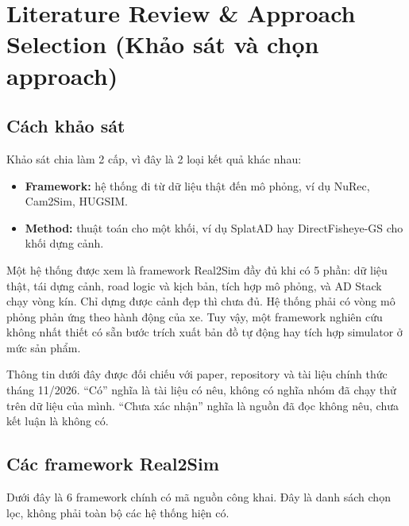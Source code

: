 \chapter{Literature Review \& Approach Selection (Khảo sát và chọn approach)}

\section{Cách khảo sát}

Khảo sát chia làm 2 cấp, vì đây là 2 loại kết quả khác nhau:
\begin{itemize}
  \item \textbf{Framework:} hệ thống đi từ dữ liệu thật đến mô phỏng, ví dụ NuRec, Cam2Sim, HUGSIM.
  \item \textbf{Method:} thuật toán cho một khối, ví dụ SplatAD hay DirectFisheye-GS cho khối dựng cảnh.
\end{itemize}

Một hệ thống được xem là framework Real2Sim đầy đủ khi có 5 phần: dữ liệu thật, tái dựng cảnh, road logic và kịch bản, tích hợp mô phỏng, và AD Stack chạy vòng kín.
Chỉ dựng được cảnh đẹp thì chưa đủ. Hệ thống phải có vòng mô phỏng phản ứng theo hành động của xe.
Tuy vậy, một framework nghiên cứu không nhất thiết có sẵn bước trích xuất bản đồ tự động hay tích hợp simulator ở mức sản phẩm.

Thông tin dưới đây được đối chiếu với paper, repository và tài liệu chính thức tháng 11/2026.
``Có'' nghĩa là tài liệu có nêu, không có nghĩa nhóm đã chạy thử trên dữ liệu của mình.
``Chưa xác nhận'' nghĩa là nguồn đã đọc không nêu, chưa kết luận là không có.

\section{Các framework Real2Sim}

Dưới đây là 6 framework chính có mã nguồn công khai.
Đây là danh sách chọn lọc, không phải toàn bộ các hệ thống hiện có.

